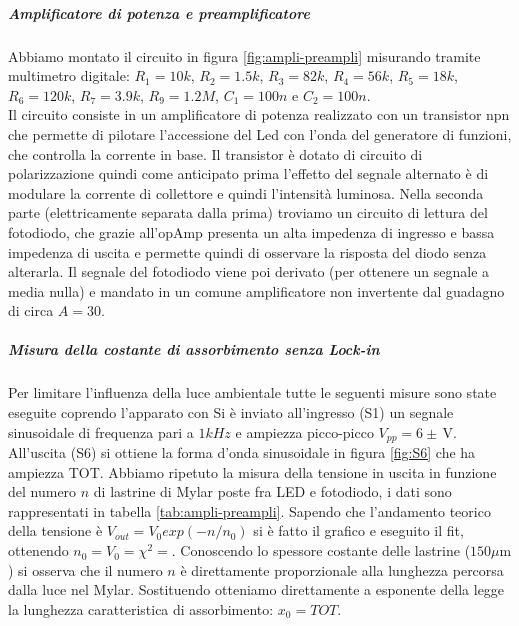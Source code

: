 \documentclass[10pt,a4paper]{article}
\begin{document}
\subparagraph{Amplificatore di potenza e preamplificatore}
Abbiamo montato il circuito in figura \ref{fig:ampli-preampli} misurando tramite multimetro digitale: $R_1=10k$, $R_2=1.5k$, $R_3=82k$, $R_4=56k$, $R_5=18k$, $R_6=120k$, $R_7=3.9k$, $R_9=1.2M$, $C_1=100n$ e $C_2=100n$.\\
Il circuito consiste in un amplificatore di potenza realizzato con un transistor npn che permette di pilotare l'accessione del Led con l'onda del generatore di funzioni, che controlla la corrente in base.
Il transistor è dotato di circuito di polarizzazione quindi come anticipato prima l'effetto del segnale alternato è di modulare la corrente di collettore e quindi l'intensità luminosa.
Nella seconda parte (elettricamente separata dalla prima) troviamo un  circuito di lettura del fotodiodo, che grazie all'opAmp presenta un alta impedenza di ingresso e bassa impedenza di uscita e permette quindi di osservare la risposta del diodo senza alterarla.
Il segnale del fotodiodo viene poi derivato (per ottenere un segnale a media nulla) e mandato in un comune amplificatore non invertente dal guadagno di circa $A = 30$.%

\subparagraph{Misura della costante di assorbimento senza Lock-in}
Per limitare l'influenza della luce ambientale tutte le seguenti misure sono state eseguite coprendo l'apparato con %
Si è inviato all'ingresso (S1) un segnale sinusoidale di frequenza pari a $1 kHz$ e ampiezza picco-picco $V_{pp}= 6 \pm \,\mbox{V}$. All'uscita (S6) si ottiene la forma d'onda sinusoidale in figura \ref{fig:S6} che ha ampiezza TOT. Abbiamo ripetuto la misura della tensione in uscita in funzione del numero $n$ di lastrine di Mylar poste fra LED e fotodiodo, i dati sono rappresentati in tabella \ref{tab:ampli-preampli}. Sapendo che l'andamento teorico della tensione è $V_{out}=V_0exp(-n/n_0)$ si è fatto il grafico e eseguito il fit, ottenendo $n_0= V_0= \chi^2=$. Conoscendo lo spessore costante delle lastrine ($150\mu \mbox{m}$) si osserva che il numero $n$ è direttamente proporzionale alla lunghezza percorsa dalla luce nel Mylar. Sostituendo otteniamo direttamente a esponente della legge la lunghezza caratteristica di assorbimento: $x_0= TOT$.
\end{document}
